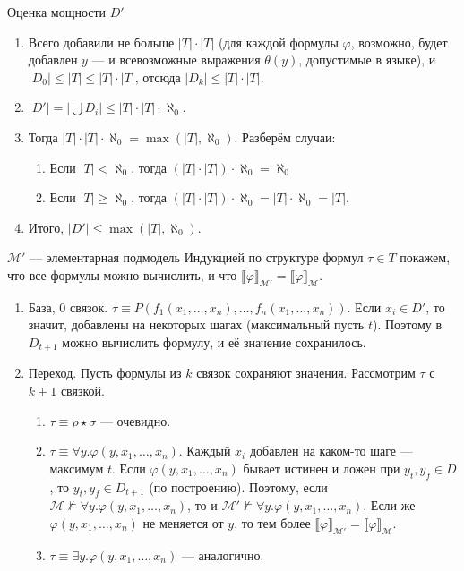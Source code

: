 \documentclass[aspectratio=169]{beamer}
\begin{document}
\begin{frame}{Оценка мощности $D'$}

\begin{enumerate}
\item Всего добавили не больше $|T| \cdot |T|$ (для каждой формулы $\varphi$, возможно, будет добавлен $y$ --- 
и всевозможные выражения $\theta(y)$, допустимые в языке), и $|D_0| \le |T| \le |T|\cdot|T|$,
отсюда $|D_k| \le |T| \cdot |T|$.
\item $|D'| = |\bigcup D_i| \le |T| \cdot |T| \cdot \aleph_0$.
\item Тогда $|T| \cdot |T| \cdot \aleph_0 = \max(|T|,\aleph_0)$. Разберём случаи:

\begin{enumerate}
\item Если $|T| < \aleph_0$, тогда $(|T| \cdot |T|) \cdot \aleph_0 = \aleph_0$
\item Если $|T| \ge \aleph_0$, тогда $(|T| \cdot |T|) \cdot \aleph_0 = |T| \cdot \aleph_0 = |T|$.

\end{enumerate}
\item Итого, $|D'| \le \max(|T|,\aleph_0)$.
\end{enumerate}

\end{frame}

\begin{frame}{$\mathcal{M}'$ --- элементарная подмодель}
Индукцией по структуре формул $\tau \in T$ покажем, 
что все формулы можно вычислить, и что $\llbracket \varphi \rrbracket_\mathcal{M'} = \llbracket \varphi \rrbracket_\mathcal{M}$.\pause

\begin{enumerate}
\item База, 0 связок. $\tau \equiv P(f_1(x_1,\dots,x_n),\dots,f_n(x_1,\dots,x_n))$. \pause Если $x_i \in D'$, то значит,
добавлены на некоторых шагах (максимальный пусть $t$). Поэтому в $D_{t+1}$ можно вычислить формулу, и её значение сохранилось. \pause
\item Переход. Пусть формулы из $k$ связок сохраняют значения. Рассмотрим $\tau$ с $k+1$ связкой. \pause
\begin{enumerate}
\item $\tau \equiv \rho \star \sigma$ --- очевидно. \pause
\item $\tau\equiv\forall y.\varphi(y,x_1,\dots,x_n)$. \pause 
Каждый $x_i$ добавлен на каком-то шаге --- максимум $t$. \pause 
Если $\varphi(y,x_1,\dots,x_n)$ бывает истинен и ложен при $y_t, y_f \in D$, то $y_t, y_f \in D_{t+1}$ (по построению). \pause
Поэтому, если $\mathcal{M}\not\models\forall y.\varphi(y,x_1,\dots,x_n)$, то и 
$\mathcal{M'}\not\models\forall y.\varphi(y,x_1,\dots,x_n)$. \pause
Если же $\varphi(y,x_1,\dots,x_n)$ не меняется от $y$, то тем более
$\llbracket \varphi \rrbracket_\mathcal{M'} = \llbracket \varphi \rrbracket_\mathcal{M}$. \pause
\item $\tau\equiv\exists y.\varphi(y,x_1,\dots,x_n)$ --- аналогично.
\end{enumerate}
\end{enumerate}
\end{frame}
\end{document}
